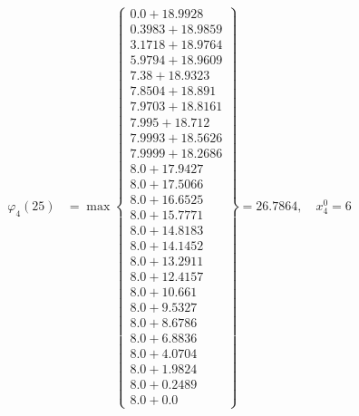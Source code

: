 \documentclass{article}
\begin{document}
\begin{align*}
\varphi_{4}(25) &= \max \left\{ \begin{array}{c}
0.0 + 18.9928 \\
 0.3983 + 18.9859 \\
 3.1718 + 18.9764 \\
 5.9794 + 18.9609 \\
 7.38 + 18.9323 \\
 7.8504 + 18.891 \\
 7.9703 + 18.8161 \\
 7.995 + 18.712 \\
 7.9993 + 18.5626 \\
 7.9999 + 18.2686 \\
 8.0 + 17.9427 \\
 8.0 + 17.5066 \\
 8.0 + 16.6525 \\
 8.0 + 15.7771 \\
 8.0 + 14.8183 \\
 8.0 + 14.1452 \\
 8.0 + 13.2911 \\
 8.0 + 12.4157 \\
 8.0 + 10.661 \\
 8.0 + 9.5327 \\
 8.0 + 8.6786 \\
 8.0 + 6.8836 \\
 8.0 + 4.0704 \\
 8.0 + 1.9824 \\
 8.0 + 0.2489 \\
 8.0 + 0.0
\end{array} \right\}=26.7864, \quad x_{4}^0=6\\
  

\end{align*}
\end{document}
